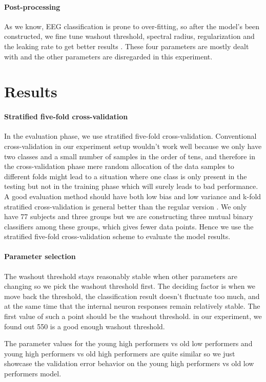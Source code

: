 \documentclass[a4paper,11pt,oneside]{article}
\begin{document}
\paragraph{Post-processing}
As we know, EEG classification is prone to over-fitting, so after the model's been constructed, we fine tune  washout threshold, spectral radius, regularization and the leaking rate to get better results \cite{lukovsevivcius2012practical}. These four parameters are mostly dealt with and the other parameters are disregarded in this experiment.

\section{Results}
\paragraph{Stratified five-fold cross-validation}
In the evaluation phase, we use stratified five-fold cross-validation. Conventional cross-validation in our experiment setup wouldn't work well because we only have two classes and a small number of samples in the order of tens, and therefore in the cross-validation phase mere random allocation of the data samples to different folds might lead to a situation where one class is only present in the testing but not in the training phase which will surely leads to bad performance. A good evaluation method should have both low bias and low variance and k-fold stratified cross-validation is general better than the regular version \cite{kohavi1995study}. We only have 77 subjects and three groups but we are constructing three mutual binary classifiers among these groups, which gives fewer data points. Hence we use the stratified five-fold cross-validation scheme to evaluate the model results.

\paragraph{Parameter selection}
The washout threshold stays reasonably stable when other parameters are changing so we pick the washout threshold first. The deciding factor is when we move back the threshold, the classification result doesn't fluctuate too much, and at the same time that the internal neuron responses remain relatively stable. The first value of such a point should be the washout threshold. in our experiment, we found out 550 is a good enough washout threshold.

The parameter values for the young high performers vs old low performers and young high performers vs old high performers are quite similar so we just showcase the validation error behavior on the young high performers vs old low performers model. 
\end{document}
